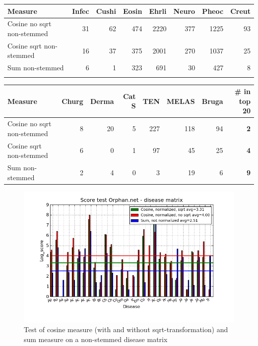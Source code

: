 \begin{table}[H]
  \begin{tiny}
    \label{testResult_diseaseMatrix_bmj_hist_norm_3000_ns_cos_sqrt_cos_sum_nn}
    \begin{tabular}{|l|r|r|r|r|r|r|r|}
      \hline
      Measure &Infec&Cushi&Eosin&Ehrli&Neuro&Pheoc&Creut \\
      \hline
      Cosine no sqrt non-stemmed &31&62&474&2220&377&1225&93 \\
      \hline
      Cosine sqrt non-stemmed &16&37&375&2001&270&1037&25 \\
      \hline
      Sum non-stemmed &6&1&323&691&30&427&8  \\
      \hline
      \multicolumn{8}{c}{} \\
    \end{tabular}
    \begin{tabular}{|l|r|r|r|r|r|r|r|}
      \hline
      Measure &Churg&Derma&Cat S&TEN&MELAS&Bruga& \scriptsize{\textbf{\# in top 20}} \\
      \hline
      Cosine no sqrt non-stemmed &8&20&5&227&118&94 &\scriptsize{\textbf{2}} \\
      \hline
      Cosine sqrt non-stemmed &6&0&1&97&45&25 &  \scriptsize{\textbf{4}}\\
      \hline
      Sum non-stemmed &2&4&0&3&19&6 & \scriptsize{\textbf{9}} \\
      \hline
    \end{tabular}
  \end{tiny}
\end{table}

\begin{figure}[H]
  \caption{Test of cosine measure (with and without sqrt-transformation) and sum measure on a non-stemmed disease matrix}
  \begin{center}
    \includegraphics[width=1.2\textwidth]{barcharts/diseaseMatrix_orphan_hist_NOTnorm_3000_ns_cos_sqrt_cos_sum_nn.png}
  \end{center}
  \label{diseaseMatrix_orphan_hist_NOTnorm_3000_ns_cos_sqrt_cos_sum_nn}
\end{figure}

